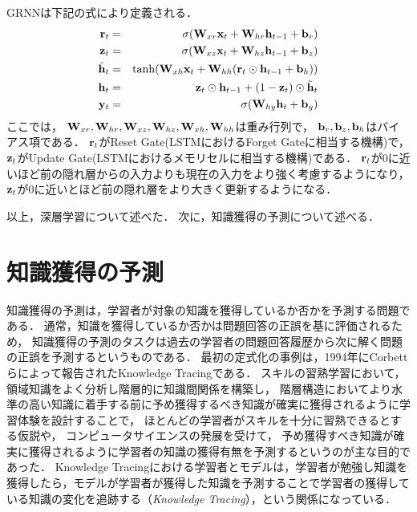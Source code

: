 GRNNは下記の式により定義される．
\begin{eqnarray}
\label{eq:grurnn1}
{\bf r}_t &=& \sigma({\bf W}_{xr}{\bf x}_t + {\bf W}_{hr}{\bf h}_{t-1} + {\bf b}_r)\\
\label{eq:grurnn2}
{\bf z}_t &=& \sigma({\bf W}_{xz}{\bf x}_t + {\bf W}_{hz}{\bf h}_{t-1} + {\bf b}_z)\\
\label{eq:grurnn3}
\tilde{{\bf h}}_t &=& \tanh({\bf W}_{xh}{\bf x}_t + {\bf W}_{hh}({\bf r}_t \odot {\bf h}_{t-1} + {\bf b}_h))\\
\label{eq:grurnn4}
{\bf h}_t &=& {\bf z}_t \odot {\bf h}_{t-1} + (1 - {\bf z}_t) \odot \tilde{{\bf h}}_t\\
\label{eq:grurnn5}
{\bf y}_t &=& \sigma( {\bf W}_{hy} {\bf h}_t + {\bf b}_y)
\end{eqnarray}
ここでは，
${\bf W}_{xr}, {\bf W}_{hr}, {\bf W}_{xz}, {\bf W}_{hz}, {\bf W}_{xh}, {\bf W}_{hh}$は重み行列で， 
${\bf b}_r, {\bf b}_z, {\bf b}_h$はバイアス項である．
${\bf r}_t$がReset Gate(LSTMにおけるForget Gateに相当する機構)で，  
${\bf z}_t$がUpdate Gate(LSTMにおけるメモリセルに相当する機構)である．
${\bf r}_t$が0に近いほど前の隠れ層からの入力よりも現在の入力をより強く考慮するようになり，
${\bf z}_t$が0に近いとほど前の隠れ層をより大きく更新するようになる．



\vvspace
以上，深層学習について述べた．
次に，知識獲得の予測について述べる．





\section{知識獲得の予測}
知識獲得の予測は，学習者が対象の知識を獲得しているか否かを予測する問題である．
通常，知識を獲得しているか否かは問題回答の正誤を基に評価されるため，
知識獲得の予測のタスクは過去の学習者の問題回答履歴から次に解く問題の正誤を予測するというものである．
最初の定式化の事例は，1994年にCorbettらによって報告されたKnowledge Tracing\cite{corbett1994knowledge}である．
スキルの習熟学習において，
領域知識をよく分析し階層的に知識間関係を構築し，
階層構造においてより水準の高い知識に着手する前に予め獲得するべき知識が確実に獲得されるように学習体験を設計することで，
ほとんどの学習者がスキルを十分に習熟できるとする仮説\cite{keller1968good, bloom1968learning}や，
コンピュータサイエンスの発展を受けて，
予め獲得すべき知識が確実に獲得されるように学習者の知識の獲得有無を予測するというのが主な目的であった．
Knowledge Tracingにおける学習者とモデルは，学習者が勉強し知識を獲得したら，モデルが学習者が獲得した知識を予測することで学習者の獲得している知識の変化を追跡する（{\it Knowledge Tracing}），という関係になっている．


